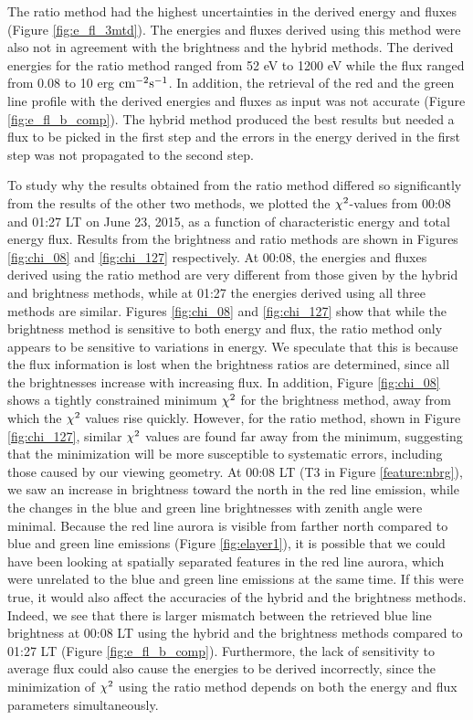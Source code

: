 \documentclass[crop=false,class=mitthesis,oneside,font=12pt]{standalone}
\begin{document}
The ratio method had the highest uncertainties in the derived energy and fluxes (Figure \ref{fig:e_fl_3mtd}). The energies and fluxes derived using this method were also not in agreement with the brightness and the hybrid methods. The derived energies for the ratio method ranged from 52 eV to 1200 eV while the flux ranged from 0.08 to 10 erg $\rm cm^{-2} s^{-1}$. In addition, the retrieval of the red and the green line profile with the derived energies and fluxes as input was not accurate (Figure \ref{fig:e_fl_b_comp}). The hybrid method produced the best results but needed a flux to be picked in the first step and the errors in the energy derived in the first step was not propagated to the second step. 

To study why the results obtained from the ratio method differed so significantly from the results of the other two methods, we plotted the $\rm \chi^2$-values from 00:08 and 01:27 LT on June 23, 2015, as a function of characteristic energy and total energy flux. Results from the brightness and ratio methods are shown in Figures \ref{fig:chi_08} and \ref{fig:chi_127} respectively. At 00:08, the energies and fluxes derived using the ratio method are very different from those given by the hybrid and brightness methods, while at 01:27 the energies derived using all three methods are similar. Figures \ref{fig:chi_08} and \ref{fig:chi_127} show that while the brightness method is sensitive to both energy and flux, the ratio method only appears to be sensitive to variations in energy. We speculate that this is because the flux information is lost when the brightness ratios are determined, since all the brightnesses increase with increasing flux. In addition, Figure \ref{fig:chi_08} shows a tightly constrained minimum $\rm \chi^2$ for the brightness method, away from which the $\rm \chi^2$ values rise quickly. However, for the ratio method, shown in Figure \ref{fig:chi_127}, similar $\rm \chi^2$ values are found far away from the minimum, suggesting that the minimization will be more susceptible to systematic errors, including those caused by our viewing geometry. At 00:08 LT (T3 in Figure \ref{feature:nbrg}), we saw an increase in brightness toward the north in the red line emission, while the changes in the blue and green line brightnesses with zenith angle were minimal. Because the red line aurora is visible from farther north compared to blue and green line emissions (Figure \ref{fig:elayer1}), it is possible that we could have been looking at spatially separated features in the red line aurora, which were unrelated to the blue and green line emissions at the same time. If this were true, it would also affect the accuracies of the hybrid and the brightness methods. Indeed, we see that there is larger mismatch between the retrieved blue line brightness at 00:08 LT using the hybrid and the brightness methods compared to 01:27 LT (Figure \ref{fig:e_fl_b_comp}). Furthermore, the lack of sensitivity to average flux could also cause the energies to be derived incorrectly, since the minimization of $\rm \chi^2$ using the ratio method depends on both the energy and flux parameters simultaneously.
\end{document}
